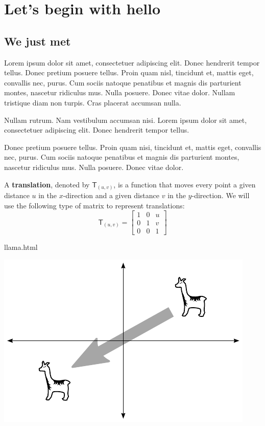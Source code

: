 \documentclass[12pt]{report}
\newcommand{\mat}{\mathsf}
\begin{document}
\chapter{Let's begin with hello}

\section{We just met}

Lorem ipsum dolor sit amet, consectetuer adipiscing elit. Donec
hendrerit tempor tellus. Donec pretium posuere tellus. Proin quam
nisl, tincidunt et, mattis eget, convallis nec, purus. Cum sociis
natoque penatibus et magnis dis parturient montes, nascetur ridiculus
mus. Nulla posuere. Donec vitae dolor. Nullam tristique diam non
turpis. Cras placerat accumsan nulla. 

\begin{ques} 
Nullam rutrum. Nam vestibulum accumsan nisi.  Lorem ipsum dolor sit
amet, consectetuer adipiscing elit. Donec hendrerit tempor
tellus. 
\end{ques}

Donec pretium posuere tellus. Proin quam nisi, tincidunt et, mattis
eget, convallis nec, purus. Cum sociis natoque penatibus et magnis dis
parturient montes, nascetur ridiculus mus. Nulla posuere. Donec vitae
dolor. 

\begin{dfn}
A \textbf{translation}, denoted by $\mat{T}_{(u,v)}$, is a function
that moves every point a given distance $u$ in the $x$-direction and a
given distance $v$ in the $y$-direction. We will use the following
type of matrix to represent translations:
\[
\mat{T}_{(u,v)} = 
\begin{bmatrix}
1 & 0 & u \\ 
0 & 1 & v \\
0 & 0 & 1
\end{bmatrix}
\]
\end{dfn}

\begin{interactive}{llama.html}
\begin{center}
\includegraphics{transIdeaEg.pdf}
\end{center}
\end{interactive}
\end{document}
